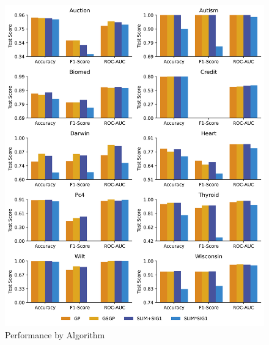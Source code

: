 
    \begin{figure}[H]
    \centering
    \includegraphics[width=\linewidth]{../Latex/Chapters/Figures/Results/RQ_Comparison_performance.png}
    \caption{Performance by Algorithm}
    \label{fig:RQ_Comparison_performance}
    \end{figure}
    